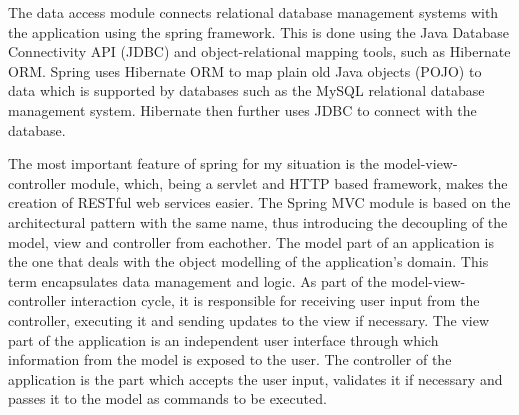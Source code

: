 \documentclass[12pt,a4paper,twoside]{report}
\begin{document}
The data access module connects relational database management systems with the application using the spring framework. This is done using the Java Database Connectivity API (JDBC) and object-relational mapping tools, such as Hibernate ORM. Spring uses Hibernate ORM to map plain old Java objects (POJO) to data which is supported by databases such as the MySQL relational database management system. Hibernate then further uses JDBC to connect with the database.

The most important feature of spring for my situation is the model-view-controller module, which, being a servlet and HTTP based framework, makes the creation of RESTful web services easier. The Spring MVC module is based on the architectural pattern with the same name, thus introducing the decoupling of the model, view and controller from eachother. The model part of an application is the one that deals with the object modelling of the application's domain. This term encapsulates data management and logic. As part of the model-view-controller interaction cycle, it is responsible for receiving user input from the controller, executing it and sending updates to the view if necessary. The view part of the application is an independent user interface through which information from the model is exposed to the user. The controller of the application is the part which accepts the user input, validates it if necessary and passes it to the model as commands to be executed.
\end{document}
